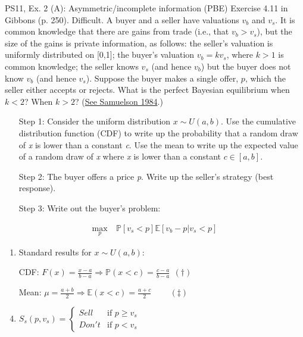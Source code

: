 \begin{frame}{PS11, Ex. 2 (A): Asymmetric/incomplete information (PBE)}
    Exercise 4.11 in Gibbons (p. 250). Difficult. A buyer and a seller have valuations $v_b$ and $v_s$. It is common knowledge that there are gains from trade (i.e., that $v_b > v_s$), but the size of the gains is private information, as follows: the seller’s valuation is uniformly distributed on [0,1]; the buyer’s valuation $v_b = kv_s$, where $k > 1$ is common knowledge; the seller knows $v_s$ (and hence $v_b$) but the buyer does not know $v_b$ (and hence $v_s$). Suppose the buyer makes a single offer, $p$, which the seller either accepts or rejects. What is the perfect Bayesian equilibrium when $k < 2$? When $k > 2$? (\href{https://www.jstor.org/stable/1911195}{See Samuelson 1984}.) \vspace{-8pt}
    \begin{multicols}{2}
      \begin{itemize}
        \item[Step 1:] Consider the uniform distribution $x\sim U(a, b)$. Use the cumulative distribution function (CDF) to write up the probability that a random draw of \textit{x} is lower than a constant \textit{c}. Use the mean to write up the expected value of a random draw of \textit{x} where \textit{x} is lower than a constant $c\in[a,b]$.
        \item[Step 2:] The buyer offers a price \textit{p}. Write up the seller's strategy (best response).
        \item[Step 3:] Write out the buyer's problem:
      \end{itemize} \vspace{-8pt}
      \begin{align*}
        \displaystyle{\max_p}&\ \mathbb{P}[v_s<p]\mathbb{E}[v_b-p|v_s<p]
      \end{align*}
      \vfill\null\columnbreak
      \begin{enumerate}
        \item Standard results for $x\sim U(a, b):$
        \item[CDF:] $F(x)=\frac{x-a}{b-a}\Rightarrow\mathbb{P}(x<c)=\frac{c-a}{b-a}\ \ (\dagger)$
        \item[Mean:] $\mu=\frac{a+b}{2}\Rightarrow\mathbb{E}(x<c)=\frac{a+c}{2}\quad\quad\ (\ddagger)$
        \item $S_s(p,v_s)=\left\{\begin{array}{ll}
          Sell  & \text{if }p\geq v_s \\
          Don't & \text{if }p < v_s
        \end{array}\right.$
      \end{enumerate}
      \vfill\null
    \end{multicols}
\end{frame}
